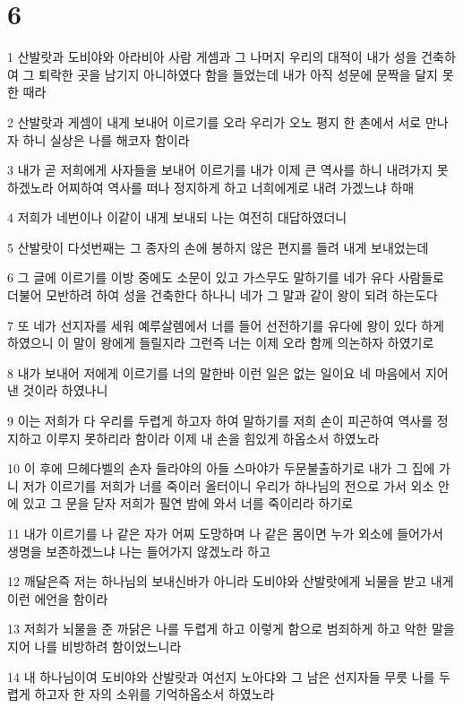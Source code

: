 \chapter{6}

\par 1 산발랏과 도비야와 아라비아 사람 게셈과 그 나머지 우리의 대적이 내가 성을 건축하여 그 퇴락한 곳을 남기지 아니하였다 함을 들었는데 내가 아직 성문에 문짝을 달지 못한 때라
\par 2 산발랏과 게셈이 내게 보내어 이르기를 오라 우리가 오노 평지 한 촌에서 서로 만나자 하니 실상은 나를 해코자 함이라
\par 3 내가 곧 저희에게 사자들을 보내어 이르기를 내가 이제 큰 역사를 하니 내려가지 못하겠노라 어찌하여 역사를 떠나 정지하게 하고 너희에게로 내려 가겠느냐 하매
\par 4 저희가 네번이나 이같이 내게 보내되 나는 여전히 대답하였더니
\par 5 산발랏이 다섯번째는 그 종자의 손에 봉하지 않은 편지를 들려 내게 보내었는데
\par 6 그 글에 이르기를 이방 중에도 소문이 있고 가스무도 말하기를 네가 유다 사람들로 더불어 모반하려 하여 성을 건축한다 하나니 네가 그 말과 같이 왕이 되려 하는도다
\par 7 또 네가 선지자를 세워 예루살렘에서 너를 들어 선전하기를 유다에 왕이 있다 하게 하였으니 이 말이 왕에게 들릴지라 그런즉 너는 이제 오라 함께 의논하자 하였기로
\par 8 내가 보내어 저에게 이르기를 너의 말한바 이런 일은 없는 일이요 네 마음에서 지어낸 것이라 하였나니
\par 9 이는 저희가 다 우리를 두렵게 하고자 하여 말하기를 저희 손이 피곤하여 역사를 정지하고 이루지 못하리라 함이라 이제 내 손을 힘있게 하옵소서 하였노라
\par 10 이 후에 므헤다벨의 손자 들라야의 아들 스마야가 두문불출하기로 내가 그 집에 가니 저가 이르기를 저희가 너를 죽이러 올터이니 우리가 하나님의 전으로 가서 외소 안에 있고 그 문을 닫자 저희가 필연 밤에 와서 너를 죽이리라 하기로
\par 11 내가 이르기를 나 같은 자가 어찌 도망하며 나 같은 몸이면 누가 외소에 들어가서 생명을 보존하겠느냐 나는 들어가지 않겠노라 하고
\par 12 깨달은즉 저는 하나님의 보내신바가 아니라 도비야와 산발랏에게 뇌물을 받고 내게 이런 에언을 함이라
\par 13 저희가 뇌물을 준 까닭은 나를 두렵게 하고 이렇게 함으로 범죄하게 하고 악한 말을 지어 나를 비방하려 함이었느니라
\par 14 내 하나님이여 도비야와 산발랏과 여선지 노아댜와 그 남은 선지자들 무릇 나를 두렵게 하고자 한 자의 소위를 기억하옵소서 하였노라
